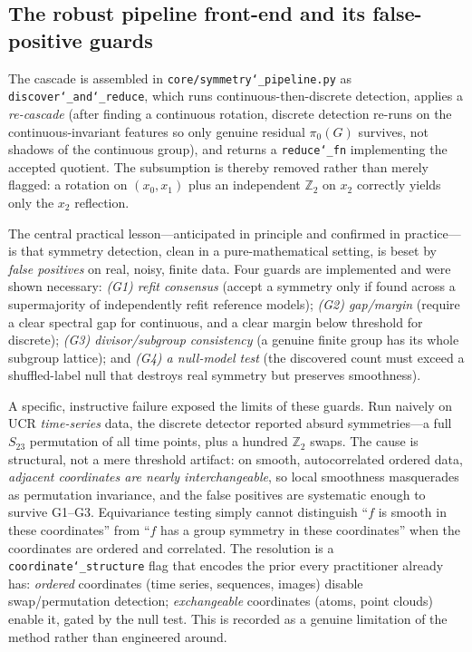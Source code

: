\documentclass[11pt]{article}
\newcommand{\allowbreakhere}{\discretionary{}{}{}}
\newcommand{\code}[1]{\texttt{\def\_{\char`_\allowbreakhere}#1}}
\begin{document}
\subsection{The robust pipeline front-end and its false-positive guards}
\label{sec:pipelinefrontend}

The cascade is assembled in \code{core/symmetry\_pipeline.py} as \code{discover\_and\_reduce}, which
runs continuous-then-discrete detection, applies a \emph{re-cascade} (after finding a continuous
rotation, discrete detection re-runs on the continuous-invariant features so only genuine residual
$\pi_0(G)$ survives, not shadows of the continuous group), and returns a \code{reduce\_fn}
implementing the accepted quotient. The subsumption is thereby removed rather than merely flagged:
a rotation on $(x_0,x_1)$ plus an independent $\mathbb{Z}_2$ on $x_2$ correctly yields only the
$x_2$ reflection.

The central practical lesson---anticipated in principle and confirmed in practice---is that
symmetry detection, clean in a pure-mathematical setting, is beset by \emph{false positives} on
real, noisy, finite data. Four guards are implemented and were shown necessary:
\emph{(G1) refit consensus} (accept a symmetry only if found across a supermajority of independently
refit reference models); \emph{(G2) gap/margin} (require a clear spectral gap for continuous, and a
clear margin below threshold for discrete); \emph{(G3) divisor/subgroup consistency} (a genuine
finite group has its whole subgroup lattice); and \emph{(G4) a null-model test} (the discovered
count must exceed a shuffled-label null that destroys real symmetry but preserves smoothness).

A specific, instructive failure exposed the limits of these guards. Run naively on UCR
\emph{time-series} data, the discrete detector reported absurd symmetries---a full $S_{23}$
permutation of all time points, plus a hundred $\mathbb{Z}_2$ swaps. The cause is structural, not a
mere threshold artifact: on smooth, autocorrelated ordered data, \emph{adjacent coordinates are
nearly interchangeable}, so local smoothness masquerades as permutation invariance, and the false
positives are systematic enough to survive G1--G3. Equivariance testing simply cannot distinguish
``$f$ is smooth in these coordinates'' from ``$f$ has a group symmetry in these coordinates'' when
the coordinates are ordered and correlated. The resolution is a \code{coordinate\_structure} flag
that encodes the prior every practitioner already has: \emph{ordered} coordinates (time series,
sequences, images) disable swap/permutation detection; \emph{exchangeable} coordinates (atoms,
point clouds) enable it, gated by the null test. This is recorded as a genuine limitation of the
method rather than engineered around.
\end{document}
